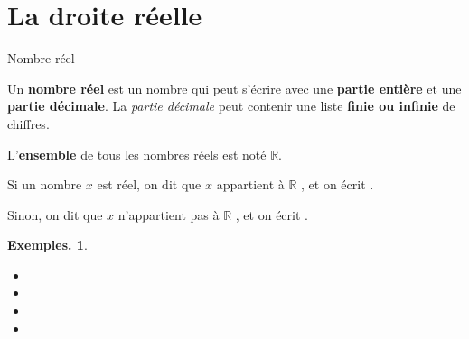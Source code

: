\documentclass[12pt]{article}
\theoremstyle{break}
\newtheorem*{examples}{Exemples.}
\begin{document}
\newcommand{\wvec}[1]{\overrightarrow{#1}}
\newcommand{\ssi}[0]{\emph{ssi}\ }

\newcommand{\droite}{\draw[<->, >=Stealth] (0,0) -- (6,0);}
\newcommand{\brGF}[1]{\node[inner sep=0pt] at (#1,0) {\Large$[$};}
\newcommand{\brGO}[1]{\node[inner sep=0pt] at (#1,0) {\Large$]$};}
\newcommand{\brDF}[1]{\node[inner sep=0pt] at (#1,0) {\Large$]$};}
\newcommand{\brDO}[1]{\node[inner sep=0pt] at (#1,0) {\Large$[$};}
\newcommand{\etiq}[2]{\node[below=10pt,inner sep=0pt] at (#1,0) {\scriptsize$#2$};}

\newpage

\pagestyle{fancy}

\fancyhf{} %
\fancyhead[R]{ {\Niveau}}
\fancyhead[L]{ {\Chapitre}}
\fancyfoot[R]{{\thepage\  / \pageref{LastPage}}}


\section{La droite réelle}

\begin{definition}{Nombre réel}{}
  \begin{multihide}
  Un \textbf{nombre réel} est un nombre qui peut s'écrire avec une \textbf{partie entière} et une \textbf{partie décimale}. La \emph{partie décimale} peut contenir une liste \textbf{finie ou infinie} de chiffres.

  L'\textbf{ensemble} de tous les nombres réels est noté $\mathbb{R}$.

  Si un nombre $x$ est réel, on dit que \og $x$ appartient à $\mathbb{R}$ \fg{}, et on écrit .

  Sinon, on dit que \og $x$ n'appartient pas à $\mathbb{R}$ \fg{}, et on écrit .
    
  \end{multihide}
\end{definition}

\begin{examples}
  \begin{itemize}
    \item[]
    \item {}
    \item {}
    \item {}
  \end{itemize}
\end{examples}
\end{document}
